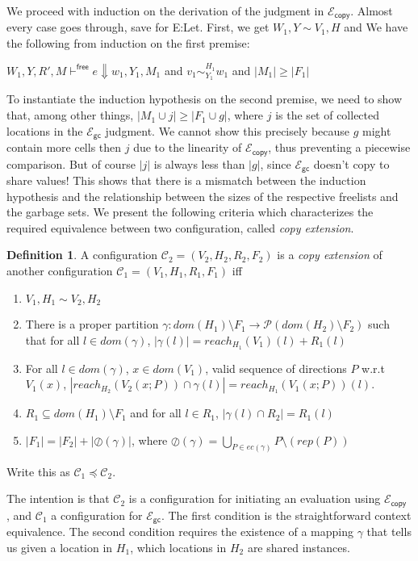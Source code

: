 \documentclass{easychair}
\newcommand{\ms}[1]{\ensuremath{\mathsf{#1}}}
\newcommand{\veq}[4]{#3 \sim^{#1}_{#2} #4}
\newcommand{\oh}[1]{\oslash(#1)}
\newcommand{\gcSem}{\ensuremath{\mathcal{E}_{\ms{gc}}}}
\newcommand{\copySem}{\ensuremath{\mathcal{E}_{\ms{copy}}}}
\theoremstyle{definition}
\newtheorem{definition}{Definition}
\begin{document}
We proceed with induction on the derivation of the judgment in \copySem. 
Almost every case goes through, save for E:Let. 
First, we get $W_1,Y \sim V_1,H$ and We have the following from induction on the first premise:
%
\begin{center}
	 $W_1,Y,R',M \vdash^{\mathsf{free}} e \Downarrow w_1,Y_1,M_1$
   \hspace{3em} and \hspace{3em}	 $\veq{H_1}{Y_1}{v_1}{w_1}$
   \hspace{3em} and \hspace{3em}	 $|M_1| \ge |F_1|$
\end{center}
%
To instantiate the induction hypothesis on the second premise, we need to show that, among 
other things, $|M_1 \cup j| \ge |F_1 \cup g|$, where $j$ is the set of collected locations in 
the \gcSem{} judgment. We cannot show this precisely because $g$ might contain more cells 
then $j$ due to the linearity of \copySem{}, thus preventing a piecewise comparison. 
But of course $|j|$ is always less than $|g|$, since \gcSem{} doesn't copy to share 
values! This shows that there is a mismatch between the induction hypothesis and the relationship
between the sizes of the respective freelists and the garbage sets. We present the following 
criteria which characterizes the required equivalence between two configuration,
called \emph{copy extension}.

\begin{definition}
A configuration $\mathcal{C}_2 = (V_2,H_2,R_2,F_2)$ is a \emph{copy extension} of another configuration
$\mathcal{C}_1 = (V_1,H_1,R_1,F_1)$ iff
\begin{enumerate}
\item $V_1,H_1 \sim V_2,H_2$
\item There is a proper partition $\gamma : dom(H_1) \setminus F_1 \to \mathcal{P}(dom(H_2) \setminus F_2)$ 
such that for all $l \in dom(\gamma)$, $|\gamma(l)| = reach_{H_1}(V_1)(l) + R_1(l)$
\item For all $l \in dom(\gamma)$, $x \in dom(V_1)$, valid sequence of directions $P$ w.r.t $V_1(x)$,
	$|reach_{H_2}(V_2(x;P)) \cap \gamma(l)| = reach_{H_1}(V_1(x;P))(l)$.
\item $R_1 \subseteq dom(H_1) \setminus F_1$ and 
	for all $l \in R_1$, $|\gamma(l) \cap R_2| = R_1(l)$
\item $|F_1| = |F_2| + |\oh{\gamma}|$, where 
	$\oh{\gamma} = \bigcup_{P \in ec(\gamma)} P \setminus (rep(P))$
\end{enumerate}
Write this as $\mathcal{C}_1 \preceq \mathcal{C}_2$.
\end{definition} 
The intention is that $\mathcal{C}_2$ is a configuration for initiating an evaluation using \copySem
, and $\mathcal{C}_1$ a configuration for \gcSem. 
The first condition is the straightforward context equivalence.
The second condition requires the existence of 
a mapping $\gamma$ that tells us given a location in $H_1$, which locations in $H_2$ 
are shared instances.
\end{document}
